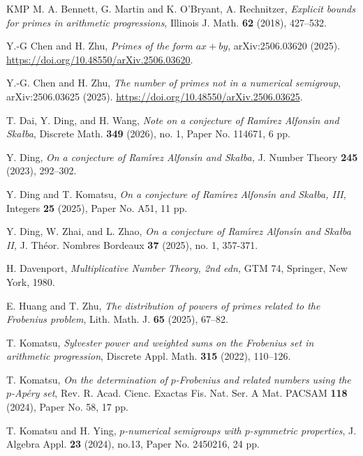 \documentclass[12pt,a4paper,reqno]{amsart}
\numberwithin{equation}{section}
\theoremstyle{plain}
\theoremstyle{definition}
\begin{document}
	
	\begin{thebibliography}{KMP}
		 M. A. Bennett, G. Martin and K. O'Bryant, A. Rechnitzer,  {\it Explicit
		bounds for primes in arithmetic progressions}, Illinois J. Math.
		{\bf62} (2018), 427--532.
		
		Y.-G Chen and H. Zhu, {\it Primes of the form $ax+by$},	arXiv:2506.03620 (2025). \url{https://doi.org/10.48550/arXiv.2506.03620}.
		
		Y.-G. Chen and H. Zhu, {\em  
			The number of primes not in a numerical semigroup},  
		arXiv:2506.03625 (2025).  \url{https://doi.org/10.48550/arXiv.2506.03625}.
		
		
		T. Dai, Y. Ding, and H. Wang, 
		{\it Note on a conjecture of Ram\'{\i}rez Alfons\'{\i}n and Ska{\l}ba}, Discrete Math. {\bf 349} (2026), no. 1, Paper No. 114671, 6 pp.
		
		Y. Ding, 
		{\it On a conjecture of Ram\'{\i}rez Alfons\'{\i}n and Ska{\l}ba,} J. Number Theory {\bf245} (2023), 292--302.
		
		
		Y. Ding and T. Komatsu,
		{\it On a conjecture of Ram\'{\i}rez Alfons\'{\i}n and Ska{\l}ba, III}, Integers {\bf25} (2025), Paper No. A51, 11 pp.
		
		Y. Ding, W. Zhai, and L. Zhao, {\em On a conjecture of Ram\'{\i}rez Alfons\'{\i}n and Ska{\l}ba II,} J. Th\'eor. Nombres Bordeaux {\bf 37} (2025), no. 1, 357-371. 
		
		 H. Davenport, {\it Multiplicative Number Theory, 2nd edn,} GTM 74, Springer, New York, 1980.
		
		E. Huang and T. Zhu, {\em The distribution of powers of primes related to the Frobenius problem}, Lith. Math. J. {\bf 65} (2025), 67--82.	
		
		T. Komatsu, {\em 
			Sylvester power and weighted sums on the Frobenius set in arithmetic progression}, 
		Discrete Appl. Math. {\bf 315} (2022), 110--126. 
		
		T. Komatsu, {\em 
			On the determination of $p$-Frobenius and related numbers using the $p$-Ap\'ery set},  
		Rev. R. Acad. Cienc. Exactas Fis. Nat. Ser. A Mat. PACSAM {\bf 118} (2024), Paper No. 58, 17 pp.  
		
		T. Komatsu and H. Ying, {\em  
			$p$-numerical semigroups with $p$-symmetric properties}, 
		J. Algebra Appl. {\bf 23} (2024), no.13, Paper No. 2450216, 24 pp. 
		

\end{thebibliography}
\end{document}

